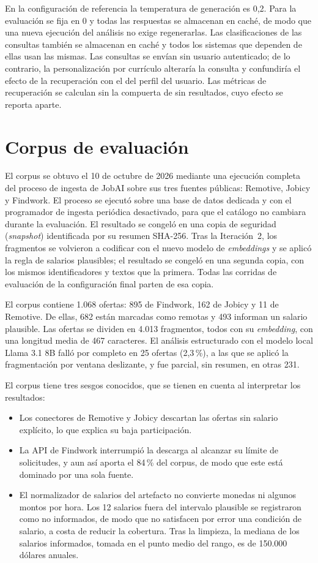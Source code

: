 En la configuración de referencia la temperatura de generación es 0,2. Para la evaluación se fija en 0 y todas las respuestas se almacenan en caché, de modo que una nueva ejecución del análisis no exige regenerarlas. Las clasificaciones de las consultas también se almacenan en caché y todos los sistemas que dependen de ellas usan las mismas. Las consultas se envían sin usuario autenticado; de lo contrario, la personalización por currículo alteraría la consulta y confundiría el efecto de la recuperación con el del perfil del usuario. Las métricas de recuperación se calculan sin la compuerta de sin resultados, cuyo efecto se reporta aparte.

\section{Corpus de evaluación}
\label{sec:met-corpus}

El corpus se obtuvo el 10 de octubre de 2026 mediante una ejecución completa del proceso de ingesta de JobAI sobre sus tres fuentes públicas: Remotive, Jobicy y Findwork. El proceso se ejecutó sobre una base de datos dedicada y con el programador de ingesta periódica desactivado, para que el catálogo no cambiara durante la evaluación. El resultado se congeló en una copia de seguridad (\textit{snapshot}) identificada por su resumen SHA-256. Tras la Iteración~2, los fragmentos se volvieron a codificar con el nuevo modelo de \textit{embeddings} y se aplicó la regla de salarios plausibles; el resultado se congeló en una segunda copia, con los mismos identificadores y textos que la primera. Todas las corridas de evaluación de la configuración final parten de esa copia.

El corpus contiene 1.068 ofertas: 895 de Findwork, 162 de Jobicy y 11 de Remotive. De ellas, 682 están marcadas como remotas y 493 informan un salario plausible. Las ofertas se dividen en 4.013 fragmentos, todos con su \textit{embedding}, con una longitud media de 467 caracteres. El análisis estructurado con el modelo local Llama 3.1 8B falló por completo en 25 ofertas (2,3\,\%), a las que se aplicó la fragmentación por ventana deslizante, y fue parcial, sin resumen, en otras 231.

El corpus tiene tres sesgos conocidos, que se tienen en cuenta al interpretar los resultados:
\begin{itemize}
    \item Los conectores de Remotive y Jobicy descartan las ofertas sin salario explícito, lo que explica su baja participación.
    \item La API de Findwork interrumpió la descarga al alcanzar su límite de solicitudes, y aun así aporta el 84\,\% del corpus, de modo que este está dominado por una sola fuente.
    \item El normalizador de salarios del artefacto no convierte monedas ni algunos montos por hora. Los 12 salarios fuera del intervalo plausible se registraron como no informados, de modo que no satisfacen por error una condición de salario, a costa de reducir la cobertura. Tras la limpieza, la mediana de los salarios informados, tomada en el punto medio del rango, es de 150.000 dólares anuales.
\end{itemize}

